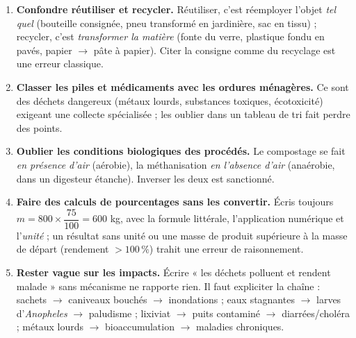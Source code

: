 \documentclass[11pt]{article}
\newcommand{\cle}[1]{{\popxbold\color{popdark}#1}}
\begin{document}
\begin{attention}
\begin{enumerate}
\item \textbf{Confondre réutiliser et recycler.} Réutiliser, c'est réemployer l'objet \emph{tel quel} (bouteille consignée, pneu transformé en jardinière, sac en tissu) ; recycler, c'est \emph{transformer la matière} (fonte du verre, plastique fondu en pavés, papier $\rightarrow$ pâte à papier). Citer la consigne comme du recyclage est une erreur classique.
\item \textbf{Classer les piles et médicaments avec les ordures ménagères.} Ce sont des déchets \cle{dangereux} (métaux lourds, substances toxiques, écotoxicité) exigeant une collecte spécialisée ; les oublier dans un tableau de tri fait perdre des points.
\item \textbf{Oublier les conditions biologiques des procédés.} Le compostage se fait \emph{en présence d'air} (aérobie), la méthanisation \emph{en l'absence d'air} (anaérobie, dans un digesteur étanche). Inverser les deux est sanctionné.
\item \textbf{Faire des calculs de pourcentages sans les convertir.} Écris toujours $m = 800 \times \dfrac{75}{100} = 600$ kg, avec la formule littérale, l'application numérique et l'\emph{unité} ; un résultat sans unité ou une masse de produit supérieure à la masse de départ (rendement $> 100\,\%$) trahit une erreur de raisonnement.
\item \textbf{Rester vague sur les impacts.} Écrire « les déchets polluent et rendent malade » sans mécanisme ne rapporte rien. Il faut expliciter la chaîne : sachets $\rightarrow$ caniveaux bouchés $\rightarrow$ inondations ; eaux stagnantes $\rightarrow$ larves d'\emph{Anopheles} $\rightarrow$ paludisme ; lixiviat $\rightarrow$ puits contaminé $\rightarrow$ diarrées/choléra ; métaux lourds $\rightarrow$ bioaccumulation $\rightarrow$ maladies chroniques.
\end{enumerate}
\end{attention}
\end{document}
